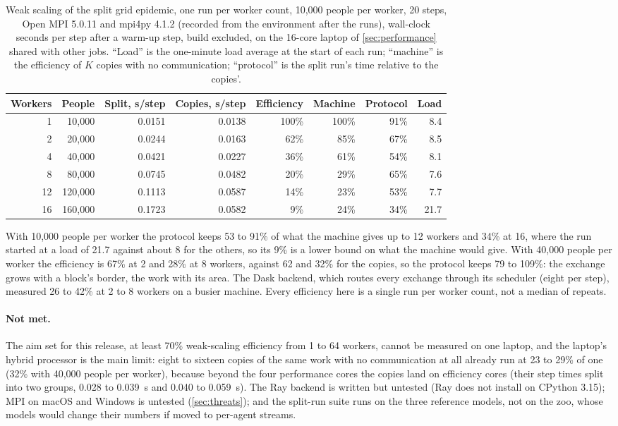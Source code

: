 \begin{table}[htbp]
  \centering
  \small
  \caption{Weak scaling of the split grid epidemic, one run per worker count, 10,000 people per
  worker, 20 steps, Open MPI 5.0.11 and mpi4py 4.1.2 (recorded from the environment after the
  runs), wall-clock seconds per step after a warm-up step, build excluded, on the 16-core
  laptop of \cref{sec:performance} shared with other jobs. ``Load'' is the one-minute load average at
  the start of each run; ``machine'' is the efficiency of $K$ copies with no communication;
  ``protocol'' is the split run's time relative to the copies'.}
  \label{tab:scaling}
  \begin{tabular}{rrrrrrrr}
    \toprule
    Workers & People & Split, s/step & Copies, s/step & Efficiency & Machine & Protocol & Load \\
    \midrule
    1  & 10,000  & 0.0151 & 0.0138 & 100\% & 100\% & 91\%& 8.4 \\
    2  & 20,000  & 0.0244 & 0.0163 & 62\%  & 85\%  & 67\%& 8.5 \\
    4  & 40,000  & 0.0421 & 0.0227 & 36\%  & 61\%  & 54\%& 8.1 \\
    8  & 80,000  & 0.0745 & 0.0482 & 20\%  & 29\%  & 65\%& 7.6 \\
    12 & 120,000 & 0.1113 & 0.0587 & 14\%  & 23\%  & 53\%& 7.7 \\
    16 & 160,000 & 0.1723 & 0.0582 & 9\%   & 24\%  & 34\%& 21.7 \\
    \bottomrule
  \end{tabular}
\end{table}

With 10,000 people per worker the protocol keeps 53 to 91\% of what the machine gives up to
12 workers and 34\% at 16, where the run started at a load of 21.7 against about 8 for the
others, so its 9\% is a lower bound on what the machine would give. With 40,000 people per
worker the efficiency is 67\% at 2 and 28\% at 8 workers, against 62 and 32\% for the copies,
so the protocol keeps 79 to 109\%: the exchange grows with a block's border, the work with its
area. The Dask backend, which routes every exchange through its scheduler (eight per step),
measured 26 to 42\% at 2 to 8 workers on a busier machine. Every efficiency here is a single
run per worker count, not a median of repeats.

\paragraph{Not met.} The aim set for this release, at least 70\% weak-scaling efficiency from
1 to 64 workers, cannot be measured on one laptop, and the laptop's hybrid processor is the
main limit: eight to sixteen copies of the same work with no communication at all already run
at 23 to 29\% of one (32\% with 40,000 people per worker), because beyond the four
performance cores the copies land on efficiency cores (their step times split into two groups, 0.028 to 0.039~s and 0.040 to
0.059~s). The Ray backend is written but untested (Ray does not install on CPython 3.15); MPI on
macOS and Windows is untested (\cref{sec:threats}); and the split-run suite runs on the three
reference models, not on the zoo, whose models would change their numbers if moved to
per-agent streams.

